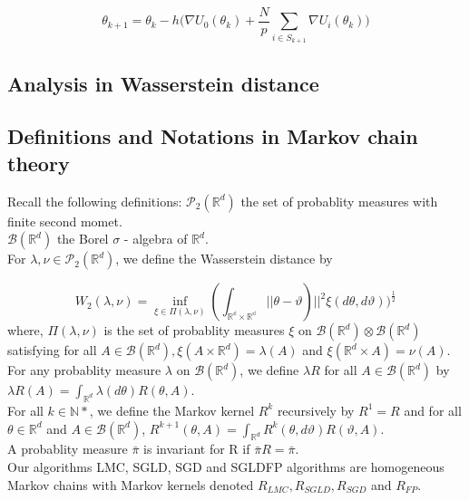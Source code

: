 $$\theta_{k+1} = \theta_{k}-h \Bigg (\nabla U_0(\theta_k)+\frac{N}{p}\sum_{i\in S_{k+1}}\nabla U_i(\theta_k)\Bigg)$$

\subsection{Analysis in Wasserstein distance}
\subsection{Definitions and Notations in Markov chain theory}
Recall the following definitions:
$\mathcal{P}_2(\mathbb{R}^d)$ the set of probablity measures with finite second momet.\\
$\mathcal{B}(\mathbb{R}^d)$ the Borel $\sigma$ - algebra of $\mathbb{R}^d$.\\
For $\lambda, \nu \in \mathcal{P}_2(\mathbb{R}^d)$, we define the Wasserstein distance by 

$$W_2(\lambda, \nu) =\inf_{\xi \in \Pi(\lambda, \nu)}(\int_{\mathbb{\mathbb{R}^d \times \mathbb{R}^d}}||\theta-\vartheta)||^2 \xi(d\theta, d\vartheta))^{\frac{1}{2}}$$
where, $\Pi(\lambda, \nu)$ is the set of probablity measures $\xi$ on $\mathcal{B}(\mathbb{R}^d)\otimes\mathcal{B}(\mathbb{R}^d)$ satisfying for all $A \in \mathcal{B}(\mathbb{R}^d), \xi(A \times \mathbb{R}^d)= \lambda(A)$ and $\xi (\mathbb{R}^d \times A) = \nu(A)$.\\
For any probablity measure $\lambda$ on $\mathcal{B}(\mathbb{R}^d)$, we define $\lambda R$ for all $A \in \mathcal{B}(\mathbb{R}^d)$ by $\lambda R(A) = \int_{\mathbb{R}^d}\lambda(d\theta)R(\theta, A)$.\\
For all $k\in \mathbb{N}*$, we define the Markov kernel $R^k$ recursively by $R^1 = R$ and for all $\theta \in \mathbb{R}^d$ and $A \in \mathcal{B}(\mathbb{R}^d)$, $R^{k+1}(\theta, A) = \int_{\mathbb{R}^d}  R^k(\theta, d\vartheta)R(\vartheta, A).$\\
A probablity measure $\bar{\pi}$ is invariant for R if $\bar{\pi}R = \bar{\pi}$.\\
Our algorithms LMC, SGLD, SGD and SGLDFP algorithms are homogeneous Markov chains with Markov kernels denoted $R_{LMC}, R_{SGLD}, R_{SGD}$ and $R_{FP}$.

